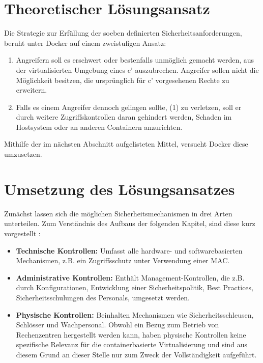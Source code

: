 \documentclass[../main.tex]{subfiles}
\begin{document}
  \section{Theoretischer Lösungsansatz}
    Die Strategie zur Erfüllung der soeben definierten Sicherheitsanforderungen, beruht unter Docker auf einem zweistufigen Ansatz:

    \begin{enumerate}[label=(\arabic*)]
      \item Angreifern soll es erschwert oder bestenfalls unmöglich gemacht werden, aus der virtualisierten Umgebung eines c' auszubrechen. Angreifer sollen nicht die Möglichkeit besitzen, die ursprünglich für c' vorgesehenen Rechte zu erweitern.
      \item Falls es einem Angreifer dennoch gelingen sollte, (1) zu verletzen, soll er durch weitere Zugriffskontrollen daran gehindert werden, Schaden im Hostsystem oder an anderen Containern anzurichten.
    \end{enumerate}

    Mithilfe der im nächsten Abschnitt aufgelisteten Mittel, versucht Docker diese umzusetzen.


  \section{Umsetzung des Lösungsansatzes} %
    Zunächst lassen sich die möglichen Sicherheitsmechanismen in drei Arten unterteilen. Zum Verständnis des Aufbaus der folgenden Kapitel, sind diese kurz vorgestellt \cite[S.40]{CISSP}:

    \begin{itemize}
      \item \textbf{Technische Kontrollen:} Umfasst alle hardware- und softwarebasierten Mechanismen, z.B. ein Zugriffsschutz unter Verwendung einer MAC.
      \item \textbf{Administrative Kontrollen:} Enthält Management-Kontrollen, die z.B. durch Konfigurationen, Entwicklung einer Sicherheitspolitik, Best Practices, Sicherheitsschulungen des Personals, umgesetzt werden.
      \item \textbf{Physische Kontrollen:} Beinhalten Mechanismen wie Sicherheitsschleusen, Schlösser und Wachpersonal. Obwohl ein Bezug zum Betrieb von Rechenzentren hergestellt werden kann, haben physische Kontrollen keine spezifische Relevanz für die containerbasierte Virtualisierung und sind aus diesem Grund an dieser Stelle nur zum Zweck der Vollständigkeit aufgeführt.
    \end{itemize}
\end{document}
